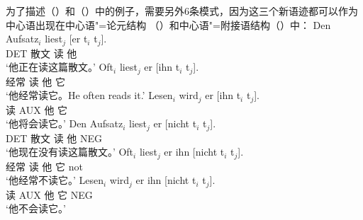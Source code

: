 为了描述（）和（）中的例子，需要另外6条模式，因为这三个新语迹都可以作为中心语出现在中心语"=论元结构 （）和中心语"=附接语结构（）中：
\eal
\ex 
\gll Den Aufsatz$_i$ liest$_j$ [er t$_i$ t$_j$].\\
	DET 散文 读 \spacebr{}他\\
\glt `他正在读这篇散文。'
\ex 
\gll Oft$_i$ liest$_j$ er [ihn t$_i$ t$_j$].\\
	 经常 读 他 \spacebr{}它\\
\glt `他经常读它。He often reads it.'
\ex 
\gll Lesen$_i$ wird$_j$ er [ihn t$_i$ t$_j$].\\
	读 AUX 他 \spacebr{}它\\
\glt `他将会读它。'
\zl
\eal
\ex 
\gll Den Aufsatz$_i$ liest$_j$ er [nicht t$_i$ t$_j$].\\
	DET 散文 读 他 \spacebr{}NEG\\
\glt `他现在没有读这篇散文。'
\ex 
\gll Oft$_i$ liest$_j$ er ihn [nicht t$_i$ t$_j$].\\
	 经常 读 他 它 \spacebr{}not\\
\glt `他经常不读它。'
\ex 
\gll Lesen$_i$ wird$_j$ er ihn [nicht t$_i$ t$_j$].\\
	 读 AUX 他 它 \spacebr{}NEG\\
\glt `他不会读它。'
